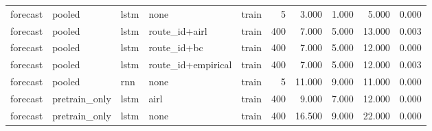 \begin{tabular}{lllllrrrrr}
forecast & pooled & lstm & none & train & 5 & 3.000 & 1.000 & 5.000 & 0.000 \\
forecast & pooled & lstm & route_id+airl & train & 400 & 7.000 & 5.000 & 13.000 & 0.003 \\
forecast & pooled & lstm & route_id+bc & train & 400 & 7.000 & 5.000 & 12.000 & 0.000 \\
forecast & pooled & lstm & route_id+empirical & train & 400 & 7.000 & 5.000 & 12.000 & 0.003 \\
forecast & pooled & rnn & none & train & 5 & 11.000 & 9.000 & 11.000 & 0.000 \\
forecast & pretrain_only & lstm & airl & train & 400 & 9.000 & 7.000 & 12.000 & 0.000 \\
forecast & pretrain_only & lstm & none & train & 400 & 16.500 & 9.000 & 22.000 & 0.000 \\
\bottomrule
\end{tabular}
